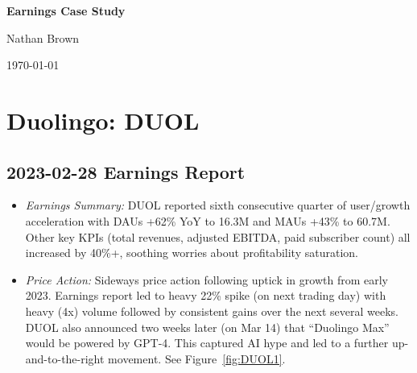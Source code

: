 \documentclass[11pt]{article}
\begin{document}
\begin{center}
    \vspace*{0.5cm}
    {\Huge\bfseries Earnings Case Study\par}
    \vspace{0.8cm}
    {\large Nathan Brown\par}
    {\large \today\par}
    \vspace{1cm}
\end{center}

\tableofcontents
\newpage

\section{Duolingo: DUOL}
    \subsection{2023-02-28 Earnings Report}
        \begin{itemize}
            \item \textit{Earnings Summary:} DUOL reported sixth consecutive quarter of user/growth acceleration with DAUs +62\% YoY to 16.3M and MAUs +43\% to 60.7M. Other key KPIs (total revenues, adjusted EBITDA, paid subscriber count) all increased by 40\%+, soothing worries about profitability saturation.
            \item \textit{Price Action:} Sideways price action following uptick in growth from early 2023. Earnings report led to heavy 22\% spike (on next trading day) with heavy (4x) volume followed by consistent gains over the next several weeks. DUOL also announced two weeks later (on Mar 14) that ``Duolingo Max'' would be powered by GPT-4. This captured AI hype and led to a further up-and-to-the-right movement. See Figure~\ref{fig:DUOL1}.
        \end{itemize}
\end{document}
